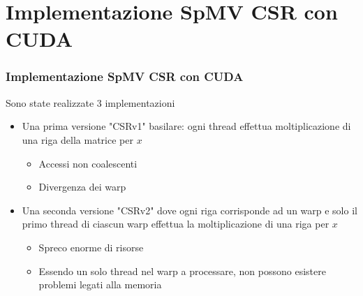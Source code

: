 \documentclass{beamer}
\begin{document}
\section{Implementazione SpMV CSR con CUDA}
\begin{frame}
    \frametitle{Implementazione SpMV CSR con CUDA}
    
    Sono state realizzate 3 implementazioni
    
    \begin{itemize}
    	\item Una prima versione "CSRv1" basilare: ogni thread effettua moltiplicazione
    	di una riga della matrice per $x$
    	\begin{itemize}
    		\item Accessi non coalescenti
    		\item Divergenza dei warp
    	\end{itemize}
    	
    	\item Una seconda versione "CSRv2" dove ogni riga corrisponde ad un warp e solo il primo
    	thread di ciascun warp effettua la moltiplicazione di una riga per $x$
    	\begin{itemize}
    		\item Spreco enorme di risorse
    		\item Essendo un solo thread nel warp a processare,
    		non possono esistere problemi legati alla memoria 
    	\end{itemize}
    \end{itemize}
\end{frame}
\end{document}
